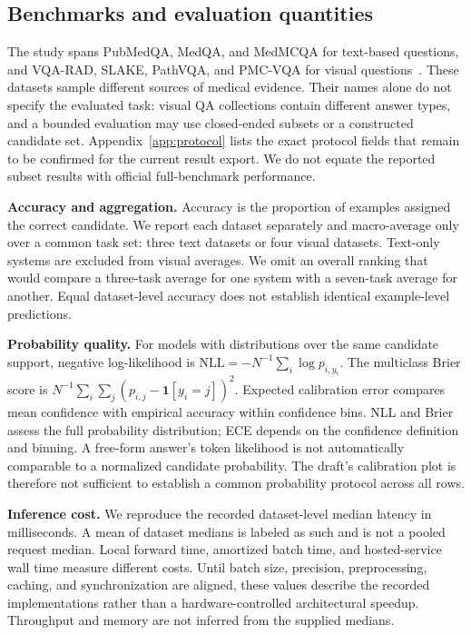 \subsection{Benchmarks and evaluation quantities}

The study spans PubMedQA, MedQA, and MedMCQA for text-based questions, and VQA-RAD, SLAKE, PathVQA, and PMC-VQA for visual questions~\cite{pubmedqa,medqa,medmcqa,vqarad,slake,pathvqa,pmcvqa}. These datasets sample different sources of medical evidence. Their names alone do not specify the evaluated task: visual QA collections contain different answer types, and a bounded evaluation may use closed-ended subsets or a constructed candidate set. Appendix~\ref{app:protocol} lists the exact protocol fields that remain to be confirmed for the current result export. We do not equate the reported subset results with official full-benchmark performance.

\textbf{Accuracy and aggregation.} Accuracy is the proportion of examples assigned the correct candidate. We report each dataset separately and macro-average only over a common task set: three text datasets or four visual datasets. Text-only systems are excluded from visual averages. We omit an overall ranking that would compare a three-task average for one system with a seven-task average for another. Equal dataset-level accuracy does not establish identical example-level predictions.

\textbf{Probability quality.} For models with distributions over the same candidate support, negative log-likelihood is $\mathrm{NLL}=-N^{-1}\sum_i\log p_{i,y_i}$. The multiclass Brier score is $N^{-1}\sum_i\sum_j(p_{i,j}-\mathbf 1[y_i=j])^2$. Expected calibration error compares mean confidence with empirical accuracy within confidence bins. NLL and Brier assess the full probability distribution; ECE depends on the confidence definition and binning. A free-form answer's token likelihood is not automatically comparable to a normalized candidate probability. The draft's calibration plot is therefore not sufficient to establish a common probability protocol across all rows.

\textbf{Inference cost.} We reproduce the recorded dataset-level median latency in milliseconds. A mean of dataset medians is labeled as such and is not a pooled request median. Local forward time, amortized batch time, and hosted-service wall time measure different costs. Until batch size, precision, preprocessing, caching, and synchronization are aligned, these values describe the recorded implementations rather than a hardware-controlled architectural speedup. Throughput and memory are not inferred from the supplied medians.

